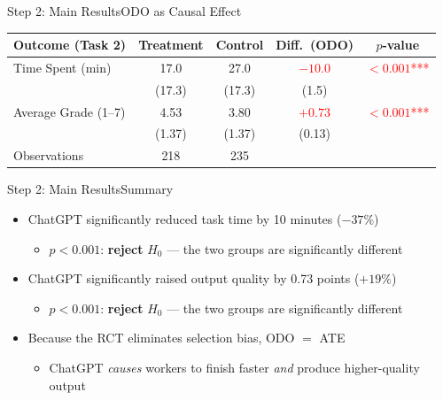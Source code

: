 \documentclass[hyperref={pdfpagelabels=false}]{beamer}
\begin{document}
\begin{frame}{Step 2: Main Results}{ODO as Causal Effect}
	\begin{center}
		\begin{threeparttable}
			\linespread{1}
			\fontsize{8.5}{8.5pt}\selectfont
			\centering
			\begin{tabular}{@{}lcccc@{}}
				\toprule
				Outcome (Task 2) & Treatment & Control & Diff.\ (ODO) & $p$-value \\
				\midrule\midrule
				Time Spent (min) & 17.0 & 27.0 & \textcolor{red}{$-10.0$} & \textcolor{red}{$<0.001$***} \\
				 & (17.3) & (17.3) & (1.5) & \\
				Average Grade (1--7) & 4.53 & 3.80 & \textcolor{red}{$+0.73$} & \textcolor{red}{$<0.001$***} \\
				 & (1.37) & (1.37) & (0.13) & \\
				\midrule\midrule
				Observations & 218 & 235 & & \\
				\bottomrule
			\end{tabular}
		\end{threeparttable}
	\end{center}
\end{frame}

\begin{frame}{Step 2: Main Results}{Summary}
	\begin{itemize}
		\item ChatGPT significantly reduced task time by 10 minutes ($-37\%$)
		\vspace{0.2cm}
		\begin{itemize}
			\item $p < 0.001$: \textbf{reject} $H_0$ --- the two groups are significantly different
		\end{itemize}
		\vspace{0.2cm}
		\item ChatGPT significantly raised output quality by 0.73 points ($+19\%$)
		\vspace{0.2cm}
		\begin{itemize}
			\item $p < 0.001$: \textbf{reject} $H_0$ --- the two groups are significantly different
		\end{itemize}
		\vspace{0.2cm}
		\item Because the RCT eliminates selection bias, ODO $=$ ATE
		\vspace{0.2cm}
		\begin{itemize}
			\item ChatGPT \emph{causes} workers to finish faster \emph{and} produce higher-quality output
		\end{itemize}
	\end{itemize}
\end{frame}
\end{document}
